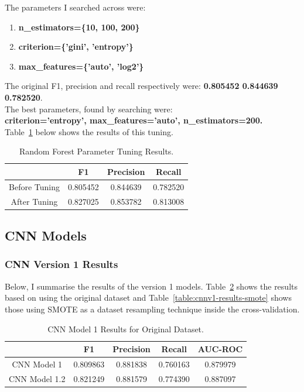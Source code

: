 \documentclass[12pt,a4paper,twoside]{report}
\begin{document}
The parameters I searched across were: \\
\begin{enumerate}
\item \textbf{n\_estimators=\{10, 100, 200\}}
\item \textbf{criterion=\{'gini', 'entropy'\}}
\item \textbf{max\_features=\{'auto', 'log2'\}}
\end{enumerate}

The original F1, precision and recall respectively were: \textbf{0.805452   0.844639  0.782520}.\\
The best parameters, found by searching were:\\
\textbf{criterion='entropy', max\_features='auto', n\_estimators=200.}\\

Table~\ref{table:rf-tuning} below shows the results of this tuning.


\begin{table}[H]  
  \centering
  \begin{tabular}{cccc}
    \toprule
           		& F1 & Precision & Recall \\ \midrule
    Before Tuning & 0.805452  & 0.844639  & 0.782520  \\
    After Tuning & 0.827025 & 0.853782 & 0.813008  \\
   \bottomrule
 \end{tabular}
 \caption{Random Forest Parameter Tuning Results.}
\label{table:rf-tuning}
\end{table}


\subsection{CNN Models}

\subsubsection{CNN Version 1 Results}

Below, I summarise the results of the version 1 models. Table~\ref{table:cnnv1-results-original} shows the results based on using the original dataset and Table~\ref{table:cnnv1-results-smote} shows those using SMOTE as a dataset resampling technique inside the cross-validation.

\begin{table}[H]  
  \centering
  \begin{tabular}{ccccc}
    \toprule
           		& F1 & Precision & Recall & AUC-ROC \\ \midrule
    CNN Model 1 & 0.809863 & 0.881838 & 0.760163 & 0.879979  \\
    CNN Model 1.2 & 0.821249 & 0.881579 & 0.774390 & 0.887097  \\
   \bottomrule
 \end{tabular}
 \caption{CNN Model 1 Results for Original Dataset.}
\label{table:cnnv1-results-original}
\end{table}
\end{document}
